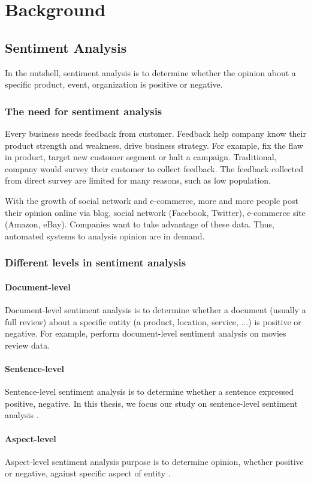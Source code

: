 \hypertarget{chap:background}{\chapter{Background}}\label{chap:background}
\section{Sentiment Analysis}
In the nutshell, sentiment analysis is to determine whether the opinion about a specific product, event, organization is positive or negative.
\subsection{The need for sentiment analysis}
Every business needs feedback from customer. Feedback help company know their product strength and weakness, drive business strategy. For example, fix the flaw in product, target new customer segment or halt a campaign. Traditional, company would survey their customer to collect feedback.  The feedback collected from direct survey are limited for many reasons, such as low population.

With the growth of social network and e-commerce, more and more people post their opinion online via blog, social network (Facebook, Twitter), e-commerce site (Amazon, eBay). Companies want to take advantage of these data. Thus, automated systems to analysis opinion are in demand.
\subsection{Different levels in sentiment analysis}
\subsubsection{Document-level}
Document-level sentiment analysis is to determine whether a document (usually a full review) about a specific entity (a product, location, service, ...) is positive or negative. For example, \cite{pang2002thumbs} perform document-level sentiment analysis on movies review data.
\subsubsection{Sentence-level}\label{sec:sent-level}
Sentence-level sentiment analysis is to determine whether a sentence expressed positive, negative. In this thesis, we focus our study on sentence-level sentiment analysis \cite{liu2012sentiment}.
\subsubsection{Aspect-level}
Aspect-level  sentiment analysis purpose is to determine opinion, whether positive or negative, against specific aspect of entity \cite{liu2012sentiment}.

